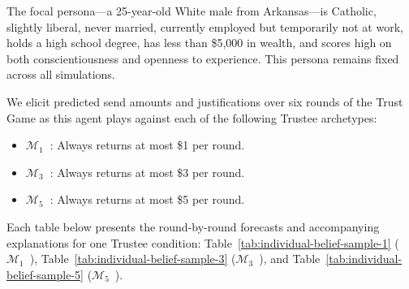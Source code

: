 \documentclass{article} %
\newcommand{\maxoneusd}{$\mathcal{M}_1$\ }
\newcommand{\maxthreeusd}{$\mathcal{M}_3$\ }
\newcommand{\maxfiveusd}{$\mathcal{M}_5$\ }
\begin{document}
\begin{appendices}
The focal persona—a 25-year-old White male from Arkansas—is Catholic, slightly liberal, never married, currently employed but temporarily not at work, holds a high school degree, has less than \$5,000 in wealth, and scores high on both conscientiousness and openness to experience. This persona remains fixed across all simulations.

We elicit predicted send amounts and justifications over six rounds of the Trust Game as this agent plays against each of the following Trustee archetypes:
\begin{itemize}[leftmargin=*]
  \item \textbf{\maxoneusd}: Always returns at most \$1 per round.
  \item \textbf{\maxthreeusd}: Always returns at most \$3 per round.
  \item \textbf{\maxfiveusd}: Always returns at most \$5 per round.
\end{itemize}

Each table below presents the round-by-round forecasts and accompanying explanations for one Trustee condition:
Table~\ref{tab:individual-belief-sample-1} (\maxoneusd), Table~\ref{tab:individual-belief-sample-3} (\maxthreeusd), and Table~\ref{tab:individual-belief-sample-5} (\maxfiveusd).


\end{appendices}
\end{document}
